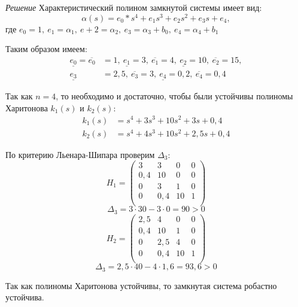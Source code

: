\documentclass[../../TAU.tex]{subfiles}
\begin{document}
    {\it Решение}
    Характеристический полином замкнутой системы имеет вид:
    $$
        \alpha(s)=e_0*s^4+e_1s^3+e_2s^2+e_3s+e_4,
    $$    
    где 
    $e_0=1,\ e_1=\alpha_1,\ e+2 =\alpha_2,\ e_3=\alpha_3+b_0,\ e_4=\alpha_4+b_1$

    Таким образом имеем:
    \begin{align*}
        \underline{e_0}=\overline{e_0}&=1,\ 
        \underline{e_1}=3,\ \overline{e_1}=4,\
        \underline{e_2}=10,\ \overline{e_2}=15,\\
        \underline{e_3}&=2{,}5,\ \overline{e_3}=3,\ 
        \underline{e_4}=0{,}2,\ \overline{e_4}=0{,}4
    \end{align*}

    Так как $n=4$, то необходимо и достаточно, чтобы были устойчивы полиномы  Харитонова 
    ${k}_1(s)$ и ${k}_2(s)$:
    \begin{align*}
        k_1(s)&=s^4+3s^3+10s^2+3s+0{,}4\\
        k_2(s)&=s^4+4s^3+10s^2+2{,}5s+0{,}4
    \end{align*}

    По критерию Льенара-Шипара проверим $\Delta_3$:
    $$
        H_1=
        \begin{pmatrix}
            3 & 3 & 0 & 0 \\
            0{,}4 & 10 & 0 & 0 \\
            0 & 3 & 1 & 0 \\
            0 & 0{,}4 & 10 & 1 \\
        \end{pmatrix}
    $$
    $$
        \Delta_3=3\cdot30-3\cdot0=90>0
    $$
    $$
        H_2=
        \begin{pmatrix}
            2{,}5 & 4 & 0 & 0 \\
            0{,}4 & 10 & 1 & 0 \\
            0 & 2{,}5 & 4 & 0 \\
            0 & 0{,}4 & 10 & 1 \\
        \end{pmatrix}
    $$
    $$
        \Delta_3=2{,}5\cdot40-4\cdot1{,}6=93{,}6>0
    $$

    Так как полиномы Харитонова устойчивы, то замкнутая система робастно устойчива.
\end{document}
